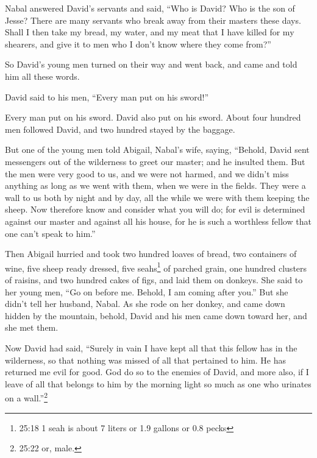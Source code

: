 \myverse{}Nabal answered David’s servants and said, “Who is David? Who
is the son of Jesse? There are many servants who break away from their masters these days.
\myverse{}Shall I then take my bread, my water, and my meat that I have killed for
my shearers, and give it to men who I don’t know where they come from?”

\myverse{}So David’s young men turned on their way and went back, and
came and told him all these words.

\myverse{}David said to his men, “Every man put on his sword!”

Every man put on his sword. David also put on his sword. About four hundred men followed
David, and two hundred stayed by the baggage.

\myverse{}But one of the young men told Abigail, Nabal’s wife, saying,
“Behold, David sent messengers out of the wilderness to greet our master; and he insulted them.
\myverse{}But the men were very good to us, and we were not harmed, and we didn’t miss
anything as long as we went with them, when we were in the fields.
\myverse{}They were a wall to us both by night and by day, all the while we were with
them keeping the sheep.
\myverse{}Now therefore know and consider what you will do; for evil is determined
against our master and against all his house, for he is such a worthless fellow that one can’t speak to
him.”

\myverse{}Then Abigail hurried and took two hundred loaves of bread, two
containers of wine, five sheep ready dressed, five seahs\footnote{25:18 1 seah is about 7 liters or 1.9 gallons or 0.8 pecks} of parched grain, one hundred clusters
of raisins, and two hundred cakes of figs, and laid them on donkeys.
\myverse{}She said to her young men, “Go on before me. Behold, I am coming after you.”
But she didn’t tell her husband, Nabal.
\myverse{}As she rode on her donkey, and came down hidden by the mountain, behold,
David and his men came down toward her, and she met them.

\myverse{}Now David had said, “Surely in vain I have kept all that this
fellow has in the wilderness, so that nothing was missed of all that pertained to him. He has returned
me evil for good.
\myverse{}God do so to the enemies of David, and more also, if I leave of all that
belongs to him by the morning light so much as one who urinates on a wall.”\footnote{25:22 or, male.}

